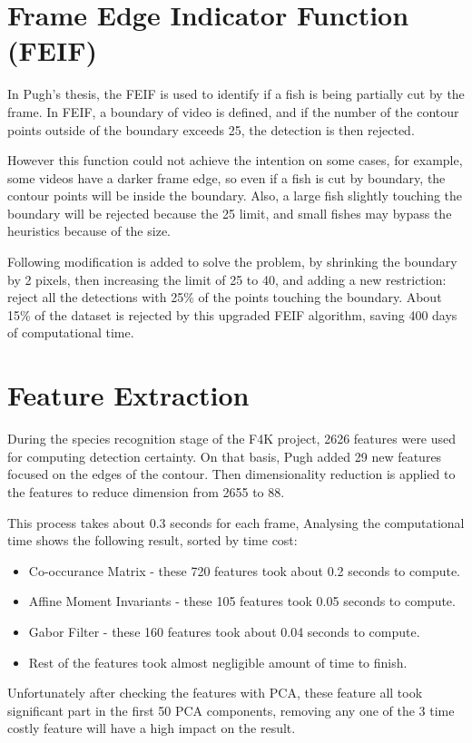 \documentclass[bsc,logo,twoside,fullspacing,parskip]{infthesis}
\begin{document}
\section{Frame Edge Indicator Function (FEIF)}

In Pugh's thesis\cite{Pugh}, the FEIF is used to identify if a fish is being partially cut by the frame. In FEIF, a boundary of video is defined, and if the number of the contour points outside of the boundary exceeds 25, the detection is then rejected.

However this function could not achieve the intention on some cases, for example, some videos have a darker frame edge, so even if a fish is cut by boundary, the contour points will be inside the boundary. Also, a large fish slightly touching the boundary will be rejected because the 25 limit, and small fishes may bypass the heuristics because of the size.

Following modification is added to solve the problem, by shrinking the boundary by 2 pixels, then increasing the limit of 25 to 40, and adding a new restriction: reject all the detections with 25\% of the points touching the boundary. About 15\% of the dataset is rejected by this upgraded FEIF algorithm, saving 400 days of computational time.

\section{Feature Extraction}

During the species recognition stage of the F4K project, 2626 features were used for computing detection certainty.
On that basis, Pugh added 29 new features focused on the edges of the contour. Then dimensionality reduction is applied to the features to reduce dimension from 2655 to 88. 

This process takes about 0.3 seconds for each frame, Analysing the computational time shows the following result, sorted by time cost:
\begin{itemize}
\item
Co-occurance Matrix - these 720 features took about 0.2 seconds to compute.
\item
Affine Moment Invariants - these 105 features took 0.05 seconds to compute.
\item
Gabor Filter - these 160 features took about 0.04 seconds to compute.
\item
Rest of the features took almost negligible amount of time to finish.
\end{itemize}
Unfortunately after checking the features with PCA, these feature all took significant part in the first 50 PCA components, removing any one of the 3 time costly feature will have a high impact on the result.
\end{document}
